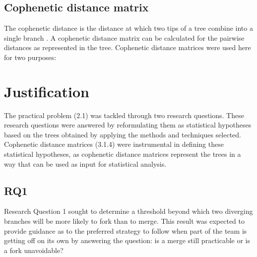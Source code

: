 \subsection{Cophenetic distance matrix}
The cophenetic distance is the distance at which two tips of a tree combine into a single branch \citep[p.1275]{RDevelopmentCoreTeam2008a}. A cophenetic distance matrix can be calculated for the pairwise distances as represented in the tree. Cophenetic distance matrices were used here for two purposes:

\begin{description}
 

 
\end{description}


\section{Justification}
The practical problem (2.1) was tackled through two research questions. These research questions were answered by reformulating them as statistical hypotheses based on the trees obtained by applying the methods and techniques selected. Cophenetic distance matrices (3.1.4) were instrumental in defining these statistical hypotheses, as cophenetic distance matrices represent the trees in a way that can be used as input for statistical analysis.

\subsection{RQ1}
Research Question 1 sought to determine a threshold beyond which two diverging branches will be more likely to fork than to merge. This result was expected to provide guidance as to the preferred strategy to follow when part of the team is getting off on its own by answering the question: is a merge still practicable or is a fork unavoidable?

